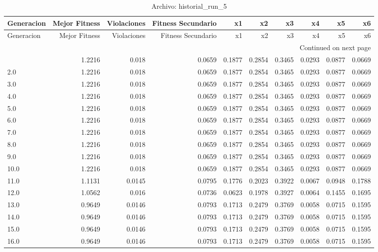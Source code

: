\begin{longtable}{lrrrrrrrrr}
\caption{Archivo: historial\_run\_5}\label{tab:historial_run_5} \\
\toprule
Generacion & Mejor Fitness & Violaciones & Fitness Secundario & x1 & x2 & x3 & x4 & x5 & x6 \\
\midrule
\endfirsthead
\toprule
Generacion & Mejor Fitness & Violaciones & Fitness Secundario & x1 & x2 & x3 & x4 & x5 & x6 \\
\midrule
\endhead
\midrule
\multicolumn{10}{r}{Continued on next page} \\
\midrule
\endfoot
\bottomrule
\endlastfoot
1.0 & 1.2216 & 0.018 & 0.0659 & 0.1877 & 0.2854 & 0.3465 & 0.0293 & 0.0877 & 0.0669 \\
2.0 & 1.2216 & 0.018 & 0.0659 & 0.1877 & 0.2854 & 0.3465 & 0.0293 & 0.0877 & 0.0669 \\
3.0 & 1.2216 & 0.018 & 0.0659 & 0.1877 & 0.2854 & 0.3465 & 0.0293 & 0.0877 & 0.0669 \\
4.0 & 1.2216 & 0.018 & 0.0659 & 0.1877 & 0.2854 & 0.3465 & 0.0293 & 0.0877 & 0.0669 \\
5.0 & 1.2216 & 0.018 & 0.0659 & 0.1877 & 0.2854 & 0.3465 & 0.0293 & 0.0877 & 0.0669 \\
6.0 & 1.2216 & 0.018 & 0.0659 & 0.1877 & 0.2854 & 0.3465 & 0.0293 & 0.0877 & 0.0669 \\
7.0 & 1.2216 & 0.018 & 0.0659 & 0.1877 & 0.2854 & 0.3465 & 0.0293 & 0.0877 & 0.0669 \\
8.0 & 1.2216 & 0.018 & 0.0659 & 0.1877 & 0.2854 & 0.3465 & 0.0293 & 0.0877 & 0.0669 \\
9.0 & 1.2216 & 0.018 & 0.0659 & 0.1877 & 0.2854 & 0.3465 & 0.0293 & 0.0877 & 0.0669 \\
10.0 & 1.2216 & 0.018 & 0.0659 & 0.1877 & 0.2854 & 0.3465 & 0.0293 & 0.0877 & 0.0669 \\
11.0 & 1.1131 & 0.0145 & 0.0795 & 0.1776 & 0.2023 & 0.3922 & 0.0067 & 0.0948 & 0.1788 \\
12.0 & 1.0562 & 0.016 & 0.0736 & 0.0623 & 0.1978 & 0.3927 & 0.0064 & 0.1455 & 0.1695 \\
13.0 & 0.9649 & 0.0146 & 0.0793 & 0.1713 & 0.2479 & 0.3769 & 0.0058 & 0.0715 & 0.1595 \\
14.0 & 0.9649 & 0.0146 & 0.0793 & 0.1713 & 0.2479 & 0.3769 & 0.0058 & 0.0715 & 0.1595 \\
15.0 & 0.9649 & 0.0146 & 0.0793 & 0.1713 & 0.2479 & 0.3769 & 0.0058 & 0.0715 & 0.1595 \\
16.0 & 0.9649 & 0.0146 & 0.0793 & 0.1713 & 0.2479 & 0.3769 & 0.0058 & 0.0715 & 0.1595 \\

\end{longtable}
